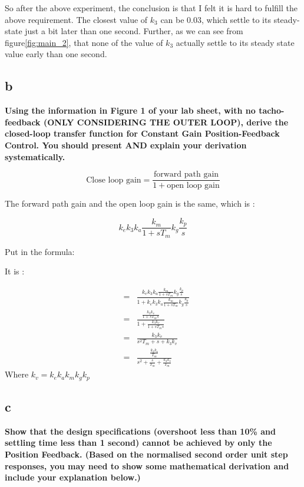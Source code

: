 \documentclass[11pt]{scrartcl}
\begin{document}
So after the above experiment, the conclusion is that I felt it is hard to fulfill the above requirement. The closest value of $k_3$ can be 0.03, which settle to its steady-state just a bit later than one second. Further, as we can see from figure\ref{fig:main_2}, that none of the value of $k_3$ actually settle to its steady state value early than one second.
\subsection *{b}
\textbf{Using the information in Figure 1 of your lab sheet, with no tacho-feedback (ONLY CONSIDERING THE OUTER LOOP), derive the closed-loop transfer function for Constant Gain Position-Feedback Control. You should present AND explain your derivation systematically. }

\begin{center}
$$ \text{Close loop gain} = \frac{\text{forward path gain}}{1+\text{open loop gain}} $$
\end{center}

The forward path gain and the open loop gain is the same, which is :
\begin{center}
$$ k_ek_3k_a\frac{k_m}{1+sT_m}k_g\frac{k_p}{s}$$
\end{center}

Put in the formula:

It is :

\begin{eqnarray*}
 &=& \frac{k_ek_3k_a\frac{k_m}{1+sT_m}k_g\frac{k_p}{s}}{1+k_ek_3k_a\frac{k_m}{1+sT_m}k_g\frac{k_p}{s}}\\
 &=& \frac{\frac{k_3k_v}{1+sT_ms}}{1+\frac{k_3k_v}{1+sT_ms}}\\
 &=& \frac{k_3k_v}{s^2T_m+s+k_3k_v}\\
 &=& \frac{\frac{k_3k_v}{T_m}}{s^2+\frac{s}{T_m}+\frac{k_3k_v}{T_m}}
\end{eqnarray*}
Where $k_v = k_ek_ak_mk_gk_p $


\subsection*{c}
\label{ssec:cpart}

\textbf{Show that the design specifications (overshoot less than 10\% and settling time less than 1 second) cannot be achieved by only the Position Feedback. (Based on the normalised second order unit step responses, you may need to show some mathematical derivation and include your explanation below.)}\\
\end{document}
